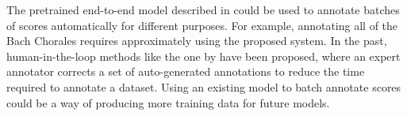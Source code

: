 
The pretrained end-to-end model described in
 could be used to annotate
batches of scores automatically for different purposes. For
example, annotating all of the Bach Chorales requires
approximately  using the
proposed system. In the past, human-in-the-loop methods like
the one by \textcite{ju2019interactive} have been proposed,
where an expert annotator corrects a set of auto-generated
annotations to reduce the time required to annotate a
dataset. Using an existing model to batch annotate scores
could be a way of producing more training data for future
models.
